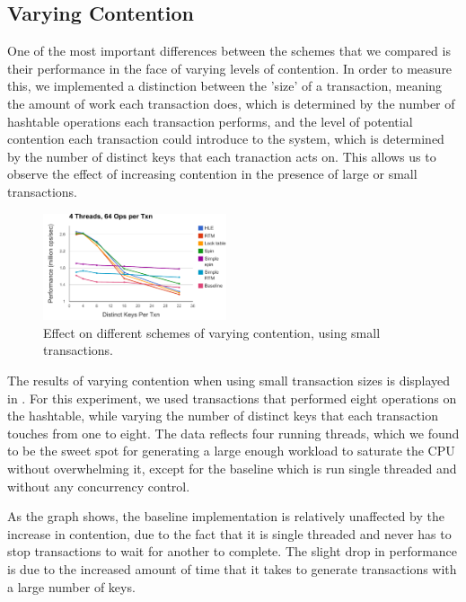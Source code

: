 \subsection{Varying Contention}

One of the most important differences between the schemes that we compared is 
their performance in the face of varying levels of contention. In order to 
measure this, we implemented a distinction between the 'size' of a transaction, 
meaning the amount of work each transaction does, which is determined by the 
number of hashtable operations each transaction performs,  and the level of 
potential contention each transaction could introduce to the system, which is 
determined by the number of distinct keys that each tranaction acts on. This 
allows us to observe the effect of increasing contention in the presence of 
large or small transactions.

\begin{figure}[h!]
  \centering
  \includegraphics[width=0.48\textwidth]{figure/small_txns.pdf}
  \caption{Effect on different schemes of varying contention, using small
    transactions.}
  \label{fig:small_txns} 
\end{figure}

The results of varying contention when using small transaction sizes is
displayed in . For this experiment, we used transactions
that performed eight operations on the hashtable, while varying the number of
distinct keys that each transaction touches from one to eight. The data reflects
four running threads, which we found to be the sweet spot for generating a large
enough workload to saturate the CPU without overwhelming it, except for the
baseline which is run single threaded and without any concurrency control.

As the graph shows, the baseline implementation is relatively unaffected by the
increase in contention, due to the fact that it is single threaded and never has
to stop transactions to wait for another to complete. The slight drop in
performance is due to the increased amount of time that it takes to generate
transactions with a large number of keys.

